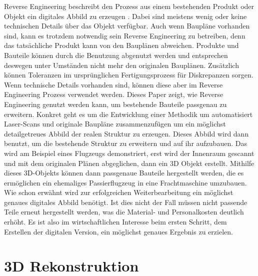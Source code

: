 Reverse Engineering beschreibt den Prozess aus einem bestehenden Produkt 
oder Objekt ein digitales Abbild zu erzeugen \cite{Helle.2021}.
Dabei sind meistens wenig oder keine technischen Details über das Objekt
verfügbar. \cite{Helle.2021}  
Auch wenn Baupläne vorhanden sind, kann es trotzdem notwendig sein 
Reverse Engineering zu betreiben, denn das tatsächliche Produkt kann von
den Bauplänen abweichen. Produkte und Bauteile können durch die Benutzung 
abgenutzt werden und entsprechen deswegen unter Umständen nicht mehr den originalen 
Bauplänen. Zusätzlich können Toleranzen im ursprünglichen Fertigungsprozess 
für Diskrepanzen sorgen. Wenn technische Details vorhanden sind,
können diese aber im Reverse Engineering Prozess verwendet werden.
\cite{Monchinger.2021} 
Dieses Paper zeigt, wie Reverse Engineering genutzt werden kann, um 
bestehende Bauteile passgenau zu erweitern. Konkret geht es um die
Entwicklung einer Methodik um automatisiert Laser-Scans und originale Baupläne
zusammenzufügen um ein möglichst detailgetreues Abbild der realen Struktur zu
erzeugen. Dieses Abbild wird dann benutzt, um die bestehende Struktur zu 
erweitern und auf ihr aufzubauen. Das wird am Beispiel eines Flugzeugs 
demonstriert, erst wird der Innenraum gescannt und mit dem originalen Plänen
abgeglichen, dann ein 3D Objekt erstellt. Mithilfe dieses 3D-Objekts können 
dann passgenaue Bauteile hergestellt werden, die es ermöglichen ein ehemaliges 
Passierflugzeug in eine Frachtmaschine umzubauen.
Wie schon erwähnt wird zur erfolgreichen Weiterbearbeitung ein möglichst 
genaues digitales Abbild benötigt.
Ist dies nicht der Fall müssen nicht passende Teile erneut hergestellt werden, 
was die Material- und Personalkosten deutlich erhöht. Es ist also im 
wirtschaftlichen Interesse beim ersten Schritt, dem Erstellen der digitalen 
Version, ein möglichst genaues Ergebnis zu erzielen. 

\section{3D Rekonstruktion}

